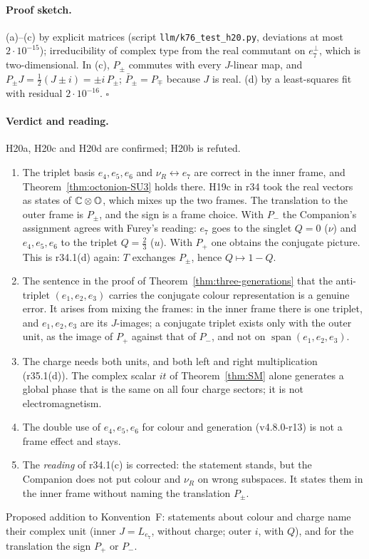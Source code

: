 \paragraph{Proof sketch.}
(a)--(c) by explicit matrices (script \texttt{llm/k76\_test\_h20.py}, deviations at most \(2\cdot10^{-15}\)); irreducibility of complex
type from the real commutant on \(e_7^\perp\), which is two-dimensional.  In (c), \(P_\pm\) commutes with every \(J\)-linear map, and
\(P_\pm J=\tfrac12(J\pm i)=\pm i\,P_\pm\); \(\bar P_\pm=P_\mp\) because \(J\) is real.  (d) by a least-squares fit with residual
\(2\cdot10^{-16}\).  \(\square\)

\paragraph{Verdict and reading.}
H20a, H20c and H20d are confirmed; H20b is refuted.
\begin{enumerate}[leftmargin=2em]
\item The triplet basis \(e_4,e_5,e_6\) and \(\nu_R\leftrightarrow e_7\) are correct in the inner frame, and
Theorem~\ref{thm:octonion-SU3} holds there.  H19c in r34 took the real vectors as states of \(\mathbb C\otimes\mathbb{O}\), which mixes up
the two frames.  The translation to the outer frame is \(P_\pm\), and the sign is a frame choice.  With \(P_-\) the Companion's
assignment agrees with Furey's reading: \(e_7\) goes to the singlet \(Q=0\) (\(\nu\)) and \(e_4,e_5,e_6\) to the triplet
\(Q=\tfrac23\) (\(u\)).  With \(P_+\) one obtains the conjugate picture.  This is r34.1(d) again: \(T\) exchanges \(P_\pm\), hence
\(Q\mapsto1-Q\).
\item The sentence in the proof of Theorem~\ref{thm:three-generations} that the anti-triplet \((e_1,e_2,e_3)\) carries the
conjugate colour representation is a genuine error.  It arises from mixing the frames: in the inner frame there is one triplet,
and \(e_1,e_2,e_3\) are its \(J\)-images; a conjugate triplet exists only with the outer unit, as the image of \(P_+\) against that
of \(P_-\), and not on \(\operatorname{span}(e_1,e_2,e_3)\).
\item The charge needs both units, and both left and right multiplication (r35.1(d)).  The complex scalar \(it\) of
Theorem~\ref{thm:SM} alone generates a global phase that is the same on all four charge sectors; it is not electromagnetism.
\item The double use of \(e_4,e_5,e_6\) for colour and generation (v4.8.0-r13) is not a frame effect and stays.
\item The \emph{reading} of r34.1(c) is corrected: the statement stands, but the Companion does not put colour and \(\nu_R\) on
wrong subspaces.  It states them in the inner frame without naming the translation \(P_\pm\).
\end{enumerate}
Proposed addition to Konvention~F: statements about colour and charge name their complex unit (inner \(J=L_{e_7}\), without
charge; outer \(i\), with \(Q\)), and for the translation the sign \(P_+\) or \(P_-\).

